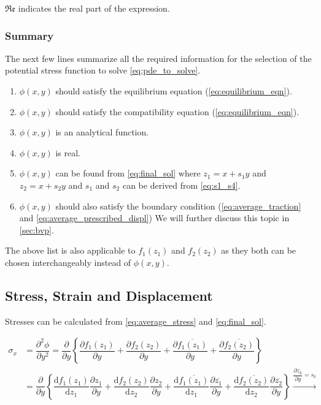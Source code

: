 \documentclass{article}
\begin{document}
$\mathfrak{Re}$ indicates the real part of the expression. 

\subsubsection{Summary}\label{sec:summary}
The next few lines summarize all the required information for the selection of the potential stress function to solve \cref{eq:pde_to_solve}.

\begin{enumerate}
    \item $\phi(x, y)$ should satisfy the equilibrium equation (\cref{eq:equilibrium_eqn}).
    \item $\phi(x, y)$ should satisfy the compatibility equation (\cref{eq:equilibrium_eqn}).
    \item $\phi(x, y)$ is an analytical function.
    \item $\phi(x, y)$ is real.
    \item $\phi(x, y)$ can be found from \cref{eq:final_sol} where $z_1 = x + s_1 y$ and $z_2 = x + s_2 y$ and $s_1$ and $s_2$ can be derived from \cref{eq:s1_s4}. 
    \item $\phi(x, y)$ should also satisfy the boundary condition (\cref{eq:average_traction} and \cref{eq:average_prescribed_displ}) We will further discuss this topic in \cref{sec:bvp}.
\end{enumerate}

The above list is also applicable to $f_1(z_1)$ and $f_2(z_2)$ as they both can be chosen interchangeably instead of $\phi(x, y)$.

\subsection{Stress, Strain and Displacement}
Stresses can be calculated from \cref{eq:average_stress} and \cref{eq:final_sol}.

\begin{align*}
    \sigma_x & = \dfrac{\partial^2 \phi}{\partial y^2} = \dfrac{\partial}{\partial y} \left\{ \dfrac{\partial f_1(z_1)}{\partial y} + \dfrac{\partial f_2(z_2)}{\partial y} + \dfrac{\partial \overline{f_1(z_1)}}{\partial y} + \dfrac{\partial \overline{f_2(z_2)}}{\partial y} \right\} & \\
    & = \dfrac{\partial}{\partial y} \left\{ \dfrac{\mathrm{d} f_1(z_1)}{\mathrm{d} z_1}\dfrac{\partial z_1}{\partial y} + 
    \dfrac{\mathrm{d} f_2(z_2)}{\mathrm{d} z_2}\dfrac{\partial z_2}{\partial y} +
    \dfrac{\mathrm{d} \overline{f_1(z_1)}}{\mathrm{d} z_1}\dfrac{\partial \overline{z_1}}{\partial y} +
    \dfrac{\mathrm{d} \overline{f_2(z_2)}}{\mathrm{d} z_2}\dfrac{\partial \overline{z_2}}{\partial y}
    \right\} \xrightarrow[]{\dfrac{\partial z_k}{\partial y} = s_k}  &
\end{align*}
\end{document}
